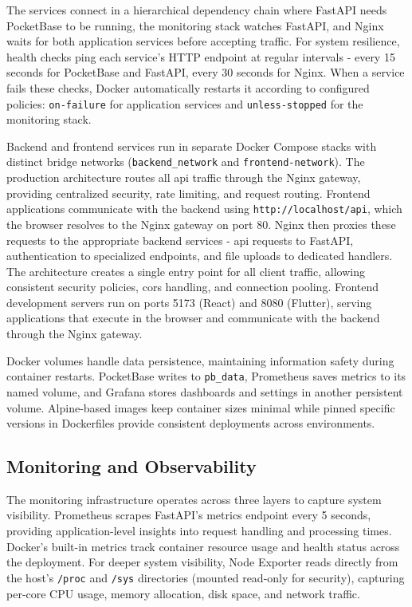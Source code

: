 The services connect in a hierarchical dependency chain where FastAPI needs PocketBase to be running, the monitoring stack watches FastAPI, and Nginx waits for both application services before accepting traffic. For system resilience, health checks ping each service's HTTP endpoint at regular intervals - every 15 seconds for PocketBase and FastAPI, every 30 seconds for Nginx. When a service fails these checks, Docker automatically restarts it according to configured policies: \texttt{on-failure} for application services and \texttt{unless-stopped} for the monitoring stack.

Backend and frontend services run in separate Docker Compose stacks with distinct bridge networks (\texttt{backend\_network} and \texttt{frontend-network}). The production architecture routes all \ac{api} traffic through the Nginx gateway, providing centralized security, rate limiting, and request routing. Frontend applications communicate with the backend using \texttt{http://localhost/api}, which the browser resolves to the Nginx gateway on port 80. Nginx then proxies these requests to the appropriate backend services - \ac{api} requests to FastAPI, authentication to specialized endpoints, and file uploads to dedicated handlers. The architecture creates a single entry point for all client traffic, allowing consistent security policies, \ac{cors} handling, and connection pooling. Frontend development servers run on ports 5173 (React) and 8080 (Flutter), serving applications that execute in the browser and communicate with the backend through the Nginx gateway.

Docker volumes handle data persistence, maintaining information safety during container restarts. PocketBase writes to \texttt{pb\_data}, Prometheus saves metrics to its named volume, and Grafana stores dashboards and settings in another persistent volume. Alpine-based images keep container sizes minimal while pinned specific versions in Dockerfiles provide consistent deployments across environments.

\subsection{Monitoring and Observability} \label{subsection:monitoring_observability}

The monitoring infrastructure operates across three layers to capture system visibility. Prometheus scrapes FastAPI's metrics endpoint every 5 seconds, providing application-level insights into request handling and processing times. Docker's built-in metrics track container resource usage and health status across the deployment. For deeper system visibility, Node Exporter reads directly from the host's \texttt{/proc} and \texttt{/sys} directories (mounted read-only for security), capturing per-core CPU usage, memory allocation, disk space, and network traffic.

